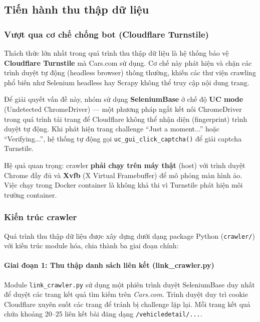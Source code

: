 \subsection{Tiến hành thu thập dữ liệu}

\subsubsection{Vượt qua cơ chế chống bot (Cloudflare Turnstile)}

Thách thức lớn nhất trong quá trình thu thập dữ liệu là hệ thống bảo vệ \textbf{Cloudflare Turnstile} mà Cars.com sử dụng. Cơ chế này phát hiện và chặn các trình duyệt tự động (headless browser) thông thường, khiến các thư viện crawling phổ biến như Selenium headless hay Scrapy không thể truy cập nội dung trang.

Để giải quyết vấn đề này, nhóm sử dụng \textbf{SeleniumBase} ở chế độ \textbf{UC mode} (Undetected ChromeDriver) — một phương pháp ngắt kết nối ChromeDriver trong quá trình tải trang để Cloudflare không thể nhận diện (fingerprint) trình duyệt tự động. Khi phát hiện trang challenge ``Just a moment...'' hoặc ``Verifying...'', hệ thống tự động gọi \texttt{uc\_gui\_click\_captcha()} để giải captcha Turnstile.

Hệ quả quan trọng: crawler \textbf{phải chạy trên máy thật} (host) với trình duyệt Chrome đầy đủ và \textbf{Xvfb} (X Virtual Framebuffer) để mô phỏng màn hình ảo. Việc chạy trong Docker container là không khả thi vì Turnstile phát hiện môi trường container.

\subsubsection{Kiến trúc crawler}

Quá trình thu thập dữ liệu được xây dựng dưới dạng package Python (\texttt{crawler/}) với kiến trúc module hóa, chia thành ba giai đoạn chính:

\paragraph{Giai đoạn 1: Thu thập danh sách liên kết (link\_crawler.py)}

Module \texttt{link\_crawler.py} sử dụng một phiên trình duyệt SeleniumBase duy nhất để duyệt các trang kết quả tìm kiếm trên \textit{Cars.com}. Trình duyệt duy trì cookie Cloudflare xuyên suốt các trang để tránh bị challenge lặp lại. Mỗi trang kết quả chứa khoảng 20--25 liên kết bài đăng dạng \texttt{/vehicledetail/...}.

